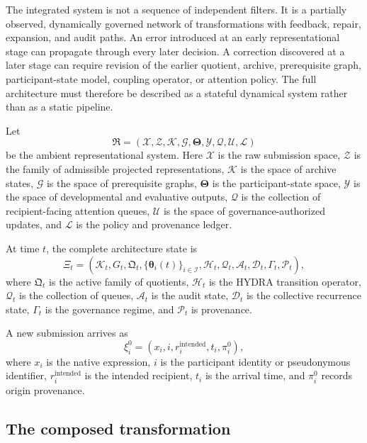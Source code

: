 \documentclass[11pt]{article}
\theoremstyle{definition}
\newcommand{\K}{\mathcal{K}}
\newcommand{\ThetaSpace}{\boldsymbol{\Theta}}
\newcommand{\thetaState}{\boldsymbol{\theta}}
\begin{document}
The integrated system is not a sequence of independent filters. It is a partially observed, dynamically governed network of transformations with feedback, repair, expansion, and audit paths. An error introduced at an early representational stage can propagate through every later decision. A correction discovered at a later stage can require revision of the earlier quotient, archive, prerequisite graph, participant-state model, coupling operator, or attention policy. The full architecture must therefore be described as a stateful dynamical system rather than as a static pipeline.

Let
\[
\mathfrak{R}
=
\left(
\mathcal{X},
\mathcal{Z},
\mathcal{K},
\mathcal{G},
\ThetaSpace,
\mathcal{Y},
\mathcal{Q},
\mathcal{U},
\mathcal{L}
\right)
\]
be the ambient representational system. Here \(\mathcal{X}\) is the raw submission space, \(\mathcal{Z}\) is the family of admissible projected representations, \(\mathcal{K}\) is the space of archive states, \(\mathcal{G}\) is the space of prerequisite graphs, \(\ThetaSpace\) is the participant-state space, \(\mathcal{Y}\) is the space of developmental and evaluative outputs, \(\mathcal{Q}\) is the collection of recipient-facing attention queues, \(\mathcal{U}\) is the space of governance-authorized updates, and \(\mathcal{L}\) is the policy and provenance ledger.

At time \(t\), the complete architecture state is
\[
\Xi_t
=
\left(
\K_t,
G_t,
\mathfrak{Q}_t,
\{\thetaState_i(t)\}_{i\in\mathcal{I}},
\mathcal{H}_t,
\mathcal{Q}_t,
\mathcal{A}_t,
\mathcal{D}_t,
\Gamma_t,
\mathcal{P}_t
\right),
\]
where \(\mathfrak{Q}_t\) is the active family of quotients, \(\mathcal{H}_t\) is the HYDRA transition operator, \(\mathcal{Q}_t\) is the collection of queues, \(\mathcal{A}_t\) is the audit state, \(\mathcal{D}_t\) is the collective recurrence state, \(\Gamma_t\) is the governance regime, and \(\mathcal{P}_t\) is provenance.

A new submission arrives as
\[
\xi_i^{0}
=
\left(
x_i,
i,
r_i^{\mathrm{intended}},
t_i,
\pi_i^{0}
\right),
\]
where \(x_i\) is the native expression, \(i\) is the participant identity or pseudonymous identifier, \(r_i^{\mathrm{intended}}\) is the intended recipient, \(t_i\) is the arrival time, and \(\pi_i^{0}\) records origin provenance.

\subsection{The composed transformation}
\end{document}
